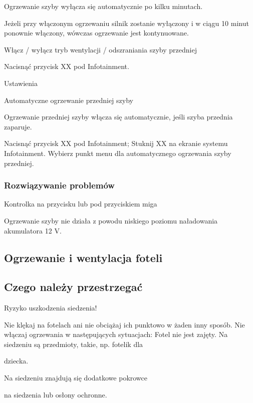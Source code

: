 Ogrzewanie szyby wyłącza się automatycznie po kilku minutach.

Jeżeli przy włączonym ogrzewaniu silnik zostanie wyłączony i w ciągu 10 minut ponownie włączony, wówczas ogrzewanie jest kontynuowane.

Włącz / wyłącz tryb wentylacji / odszraniania szyby przedniej

\begin{itemizeArrow}
	\itemArrow Nacisnąć przycisk XX pod Infotainment.
\end{itemizeArrow}

Ustawienia

Automatyczne ogrzewanie przedniej szyby

Ogrzewanie przedniej szyby włącza się automatycznie, jeśli szyba przednia zaparuje.

\begin{itemizeArrow}
	\itemArrow Nacisnąć przycisk XX pod Infotainment; Stuknij XX na ekranie systemu Infotainment.
	\itemArrow Wybierz punkt menu dla automatycznego ogrzewania szyby przedniej.
\end{itemizeArrow}

\subsubsection{Rozwiązywanie problemów}

Kontrolka na przycisku lub pod przyciskiem miga

Ogrzewanie szyby nie działa z powodu niskiego poziomu naładowania akumulatora 12 V.

\subsection{Ogrzewanie i wentylacja foteli}

\subsection{Czego należy przestrzegać}

Ryzyko uszkodzenia siedzenia!
\begin{itemizeTriangle}
	\itemTriangle Nie klękaj na fotelach ani nie obciążaj ich punktowo w żaden inny sposób.
	\itemTriangle Nie włączaj ogrzewania w następujących sytuacjach:
		\itemTriangle Fotel nie jest zajęty.
		\itemTriangle Na siedzeniu są przedmioty, takie, np. fotelik dla
\end{itemizeTriangle}
	dziecka.
\begin{itemizeTriangle}
		\itemTriangle Na siedzeniu znajdują się dodatkowe pokrowce
\end{itemizeTriangle}
	na siedzenia lub osłony ochronne.

